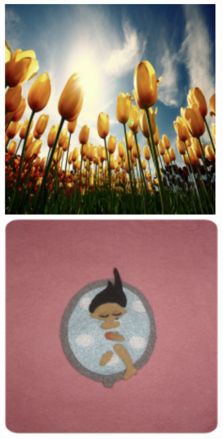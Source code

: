 \documentclass[]{article}
\begin{document}
	\begin{figure}[H]
		\includegraphics[scale=0.35]{orig_1.png}
		\includegraphics[scale=0.35]{orig_2.png}

\end{figure}
\end{document}
